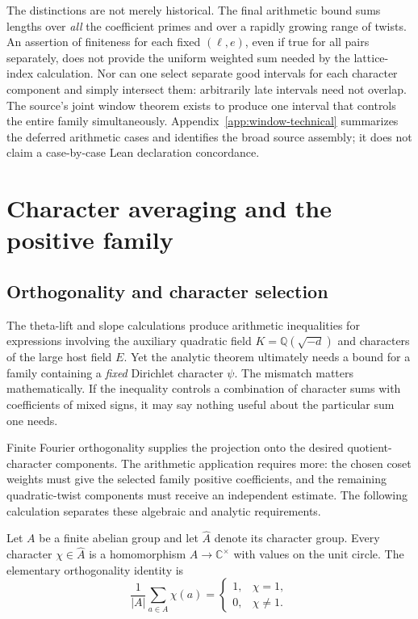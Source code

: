 \documentclass[11pt,openany,oneside]{scrbook}
\theoremstyle{definition}
\theoremstyle{remark}
\newcommand{\CC}{\mathbb C}
\newcommand{\QQ}{\mathbb Q}
\begin{document}
The distinctions are not merely historical.  The final arithmetic bound sums lengths over \emph{all} the coefficient primes and over a rapidly growing range of twists.  An assertion of finiteness for each fixed $(\ell,e)$, even if true for all pairs separately, does not provide the uniform weighted sum needed by the lattice-index calculation.  Nor can one select separate good intervals for each character component and simply intersect them: arbitrarily late intervals need not overlap.  The source's joint window theorem exists to produce one interval that controls the entire family simultaneously.  Appendix~\ref{app:window-technical} summarizes the deferred arithmetic cases and identifies the broad source assembly; it does not claim a case-by-case Lean declaration concordance.

\chapter{Character averaging and the positive family}\label{ch:fourier}

\section{Orthogonality and character selection}

The theta-lift and slope calculations produce arithmetic inequalities for expressions involving the auxiliary quadratic field $K=\QQ(\sqrt{-d})$ and characters of the large host field $E$. Yet the analytic theorem ultimately needs a bound for a family containing a \emph{fixed} Dirichlet character $\psi$. The mismatch matters mathematically. If the inequality controls a combination of character sums with coefficients of mixed signs, it may say nothing useful about the particular sum one needs.

Finite Fourier orthogonality supplies the projection onto the desired quotient-character components. The arithmetic application requires more: the chosen coset weights must give the selected family positive coefficients, and the remaining quadratic-twist components must receive an independent estimate. The following calculation separates these algebraic and analytic requirements.

Let $A$ be a finite abelian group and let $\widehat A$ denote its character group. Every character $\chi\in\widehat A$ is a homomorphism $A\to\CC^\times$ with values on the unit circle. The elementary orthogonality identity is
\begin{equation}\label{eq:characterorthog}
\frac1{|A|}\sum_{a\in A}\chi(a)
=\begin{cases}1,&\chi=1,\\0,&\chi\ne1.\end{cases}
\end{equation}
\end{document}

